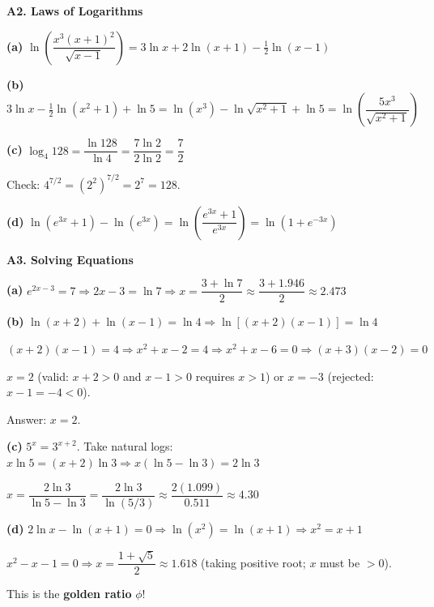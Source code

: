 \documentclass[12pt, a4paper]{article}
\theoremstyle{definition}
\begin{document}
\begin{solbox}
\textbf{A2. Laws of Logarithms}

\textbf{(a)} $\ln\!\left(\dfrac{x^3(x+1)^2}{\sqrt{x-1}}\right)
= 3\ln x + 2\ln(x+1) - \tfrac{1}{2}\ln(x-1)$

\textbf{(b)} $3\ln x - \tfrac{1}{2}\ln(x^2+1) + \ln 5
= \ln(x^3) - \ln\!\sqrt{x^2+1} + \ln 5
= \ln\!\left(\dfrac{5x^3}{\sqrt{x^2+1}}\right)$

\textbf{(c)} $\log_4 128 = \dfrac{\ln 128}{\ln 4} = \dfrac{7\ln 2}{2\ln 2} = \dfrac{7}{2}$

Check: $4^{7/2} = (2^2)^{7/2} = 2^7 = 128$. \checkmark

\textbf{(d)} $\ln(e^{3x}+1) - \ln(e^{3x}) = \ln\!\left(\dfrac{e^{3x}+1}{e^{3x}}\right) = \ln\!\left(1 + e^{-3x}\right)$
\end{solbox}

\begin{solbox}
\textbf{A3. Solving Equations}

\textbf{(a)} $e^{2x-3}=7 \Rightarrow 2x-3=\ln 7 \Rightarrow x = \dfrac{3+\ln 7}{2} \approx \dfrac{3+1.946}{2} \approx 2.473$

\textbf{(b)} $\ln(x+2)+\ln(x-1)=\ln 4 \Rightarrow \ln[(x+2)(x-1)]=\ln 4$

$(x+2)(x-1) = 4 \Rightarrow x^2+x-2=4 \Rightarrow x^2+x-6=0 \Rightarrow (x+3)(x-2)=0$

$x=2$ (valid: $x+2>0$ and $x-1>0$ requires $x>1$) or $x=-3$ (rejected: $x-1=-4<0$).

Answer: $x=2$.

\textbf{(c)} $5^x = 3^{x+2}$. Take natural logs:
$x\ln 5 = (x+2)\ln 3 \Rightarrow x(\ln 5 - \ln 3) = 2\ln 3$

$x = \dfrac{2\ln 3}{\ln 5-\ln 3} = \dfrac{2\ln 3}{\ln(5/3)} \approx \dfrac{2(1.099)}{0.511} \approx 4.30$

\textbf{(d)} $2\ln x - \ln(x+1) = 0 \Rightarrow \ln(x^2) = \ln(x+1) \Rightarrow x^2=x+1$

$x^2-x-1=0 \Rightarrow x = \dfrac{1+\sqrt{5}}{2} \approx 1.618$ (taking positive root; $x$ must be $>0$).

This is the \textbf{golden ratio} $\phi$!
\end{solbox}
\end{document}
